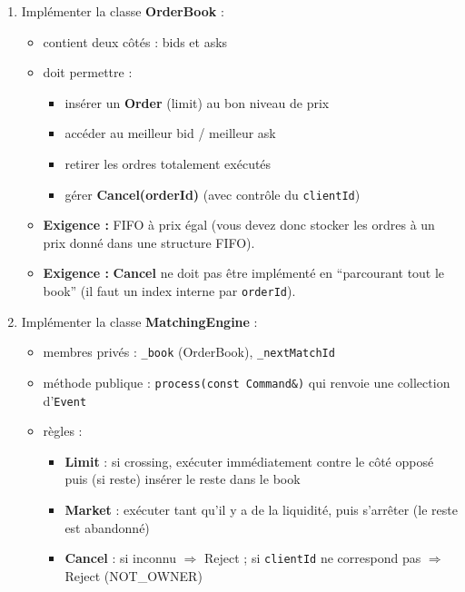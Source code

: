 \documentclass[11pt,a4paper]{article}
\begin{document}
\begin{enumerate}
  \item Implémenter la classe \textbf{OrderBook} :
  \begin{itemize}
    \item contient deux côtés : bids et asks
    \item doit permettre :
      \begin{itemize}
        \item insérer un \textbf{Order} (limit) au bon niveau de prix
        \item accéder au meilleur bid / meilleur ask
        \item retirer les ordres totalement exécutés
        \item gérer \textbf{Cancel(orderId)} (avec contrôle du \texttt{clientId})
      \end{itemize}
    \item \textbf{Exigence :} FIFO à prix égal (vous devez donc stocker les ordres à un prix donné dans une structure FIFO).
    \item \textbf{Exigence :} \textbf{Cancel} ne doit pas être implémenté en “parcourant tout le book” (il faut un index interne par \texttt{orderId}).
  \end{itemize}

  \item Implémenter la classe \textbf{MatchingEngine} :
  \begin{itemize}
    \item membres privés : \texttt{\_book} (OrderBook), \texttt{\_nextMatchId}
    \item méthode publique : \texttt{process(const Command\&)} qui renvoie une collection d’\texttt{Event}
    \item règles :
      \begin{itemize}
        \item \textbf{Limit} : si crossing, exécuter immédiatement contre le côté opposé puis (si reste) insérer le reste dans le book
        \item \textbf{Market} : exécuter tant qu’il y a de la liquidité, puis s’arrêter (le reste est abandonné)
        \item \textbf{Cancel} : si inconnu $\Rightarrow$ Reject ; si \texttt{clientId} ne correspond pas $\Rightarrow$ Reject (NOT\_OWNER)
      \end{itemize}
  \end{itemize}
\end{enumerate}
\end{document}
